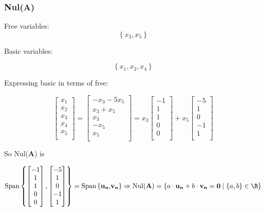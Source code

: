 \documentclass{article}
\begin{document}
\subsubsection{Nul(\textbf{A})} 
Free variables:
\[%
    \left\{ x_3,x_5 \right\}
\]%



Basic variables:

\[%
    \left\{ x_1,x_2,x_4 \right\}
\]%

Expressing basic in terms of free:

\[%
    \begin{bmatrix} 
        x_1 \\
		x_2 \\
		x_3 \\
		x_4 \\
		x_5 \\		
    \end{bmatrix}
    =
    \begin{bmatrix} 
        -x_3 -5 x_5 \\
		x_3+x_5 \\
		x_3 \\
		-x_5 \\
		x_5 \\		
    \end{bmatrix}
    =
    x_3
    \begin{bmatrix} 
        -1 \\
		1 \\
		1 \\
		0 \\
		0 \\		
    \end{bmatrix}
    +
    x_5
    \begin{bmatrix} 
        -5 \\
		1 \\
		0 \\
		-1 \\
		1 \\		
    \end{bmatrix}
\]%

So Nul($ \mathbf{A} $) is

\[%
    \text{Span} \left\{  
    \begin{bmatrix} 
        -1 \\
		1 \\
		1 \\
		0 \\
		0 \\		
    \end{bmatrix}
    ,
    \begin{bmatrix} 
        -5 \\
		1 \\
		0 \\
		-1 \\
		1 \\		
    \end{bmatrix}
    \right\}
    =
    \text{Span} \left\{ \mathbf{u_{n},} \mathbf{v_n}  \right\}
    \Rightarrow 
    \text{Nul}(\mathbf{A})
    =
    \left\{ 
    a \cdot\mathbf{u_{n}} + b \cdot \mathbf{v_n} = \mathbf{0}  \mid \left\{ a,b \right\}
    \in \R
    \right\}
\]%
\end{document}
